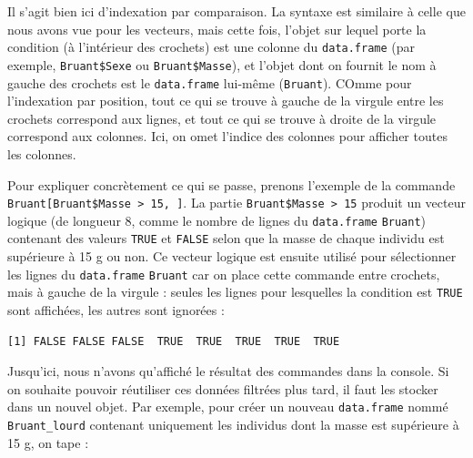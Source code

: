 \documentclass[
  a4paper,
  DIV=11,
  numbers=noendperiod,
  oneside]{scrreprt}
\newenvironment{Shaded}{}{}
\newcommand{\DecValTok}[1]{\textcolor[rgb]{0.00,0.36,0.77}{#1}}
\newcommand{\NormalTok}[1]{\textcolor[rgb]{0.14,0.16,0.18}{#1}}
\newcommand{\OtherTok}[1]{\textcolor[rgb]{0.44,0.26,0.76}{#1}}
\newcommand{\SpecialCharTok}[1]{\textcolor[rgb]{0.00,0.36,0.77}{#1}}
\begin{document}
Il s'agit bien ici d'indexation par comparaison. La syntaxe est
similaire à celle que nous avons vue pour les vecteurs, mais cette fois,
l'objet sur lequel porte la condition (à l'intérieur des crochets) est
une colonne du \texttt{data.frame} (par exemple, \texttt{Bruant\$Sexe}
ou \texttt{Bruant\$Masse}), et l'objet dont on fournit le nom à gauche
des crochets est le \texttt{data.frame} lui-même (\texttt{Bruant}).
COmme pour l'indexation par position, tout ce qui se trouve à gauche de
la virgule entre les crochets correspond aux lignes, et tout ce qui se
trouve à droite de la virgule correspond aux colonnes. Ici, on omet
l'indice des colonnes pour afficher toutes les colonnes.

Pour expliquer concrètement ce qui se passe, prenons l'exemple de la
commande \texttt{Bruant{[}Bruant\$Masse\ \textgreater{}\ 15,\ {]}}. La
partie \texttt{Bruant\$Masse\ \textgreater{}\ 15} produit un vecteur
logique (de longueur 8, comme le nombre de lignes du \texttt{data.frame}
\texttt{Bruant}) contenant des valeurs \texttt{TRUE} et \texttt{FALSE}
selon que la masse de chaque individu est supérieure à 15 g ou non. Ce
vecteur logique est ensuite utilisé pour sélectionner les lignes du
\texttt{data.frame} \texttt{Bruant} car on place cette commande entre
crochets, mais à gauche de la virgule : seules les lignes pour
lesquelles la condition est \texttt{TRUE} sont affichées, les autres
sont ignorées :

\begin{Shaded}
\end{Shaded}

\begin{verbatim}
[1] FALSE FALSE FALSE  TRUE  TRUE  TRUE  TRUE  TRUE
\end{verbatim}

Jusqu'ici, nous n'avons qu'affiché le résultat des commandes dans la
console. Si on souhaite pouvoir réutiliser ces données filtrées plus
tard, il faut les stocker dans un nouvel objet. Par exemple, pour créer
un nouveau \texttt{data.frame} nommé \texttt{Bruant\_lourd} contenant
uniquement les individus dont la masse est supérieure à 15 g, on tape :

\begin{Shaded}
\end{Shaded}
\end{document}
